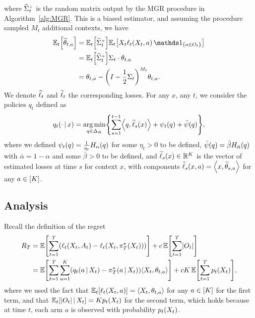 %
where $\whsigmaplust$ is the random matrix output by the MGR procedure in Algorithm~\ref{alg:MGR}. This is a biased estimator, and assuming the procedure sampled $M_t$ additional contexts, we have 
%
\begin{align*}
    \bbE_t \sbr*{\wt{\theta}_{t, a}} &= \bbE_t \sbr*{\whsigmaplust} \bbE_t \sbr*{X_t \ell_t \spr*{X_t, a} \, \ind_{\scbr*{a \in O_t}}}\\
    &= \bbE_t \sbr*{\whsigmaplust} \Sigma_t \cdot \theta_{t, a}\\
    &= \theta_{t, a} - \spr*{I - \frac12 \Sigma_t}^{M_t} \theta_{t, a}.
\end{align*}
%
We denote $\wh{\ell}_t$ and $\wt{\ell}_t$ the corresponding losses. For any $x$, any $t$, we consider the policies $q_t$ defined as
%
\begin{equation*}
    q_t \spr*{\cdot \given x} = \argmin_{q \in \Delta_K} \scbr*{\sum_{s=1}^{t-1} \inp*{q, \wt \ell_s \spr*{x}} + \psi_t \spr*{q} + \bar\psi \spr*{q}},
\end{equation*}
%
where we defined $\psi_t \spr*{q} = \frac{1}{\eta_t} H_\alpha \spr*{q}$ for some $\eta_t > 0$ to be defined, $\bar\psi \spr*{q} = \bar\beta H_{\bar\alpha} \spr*{q}$ with $\bar\alpha = 1 - \alpha$ and some $\bar\beta > 0$ to be defined, and $\wt \ell_s \spr*{x} \in \bbR^K$ is the vector of estimated losses at time $s$ for context $x$, with components $\wt \ell_s \spr*{x, a} = \inp*{x, \wt \theta_{s, a}}$ for any $a \in \sbr*{K}$.



\subsection{Analysis}



Recall the definition of the regret
%
\begin{align*}
    R_T &= \bbE \sbr*{\sumtT \spr*{\ell_t \spr*{X_t, A_t} - \ell_t \spr*{X_t, \pi_T^\star \spr*{X_t}}}} + c\,\bbE \sbr*{\sumtT \abs*{O_t}}\\
    &= \bbE \sbr*{\sumtT \sumaK \spr*{q_t \spr*{a \given X_t} - \pi_T^\star \spr*{a \given X_t}} \inp*{X_t, \theta_{t, a}}} + c K\,\bbE \sbr*{\sumtT p_t \spr*{X_t}},
\end{align*}
%
where we used the fact that $\bbE_t \sbr*{\ell_t \spr*{X_t, a}} = \inp*{X_t, \theta_{t, a}}$ for any $a \in \sbr*{K}$ for the first term, and that $\bbE_t \sbr*{\abs*{O_t} \given X_t} = K p_t \spr*{X_t}$ for the second term, which holds because at time $t$, each arm $a$ is observed with probability $p_t \spr*{X_t}$.

